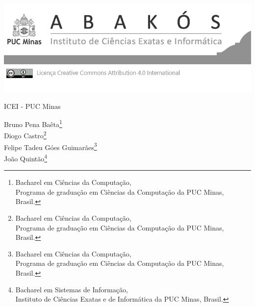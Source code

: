\documentclass[a4paper,12pt,Times]{article}
\makeatletter
\newcommand{\monogES}{ICEI - PUC Minas}
\newcommand{\origem}{Brasil}  %
\newcommand{\AutorA}{Felipe Tadeu Góes Guimarães}
\newcommand{\funcaoA}{Bacharel em Ciências da Computação}
\newcommand{\cursA}{Programa de graduação em Ciências da Computação da PUC Minas}
\newcommand{\AutorB}{Bruno Pena Baêta}
\newcommand{\funcaoB}{Bacharel em Ciências da Computação}
\newcommand{\cursB}{Programa de graduação em Ciências da Computação da PUC Minas}
\newcommand{\AutorC}{Diogo Castro}
\newcommand{\funcaoC}{Bacharel em Ciências da Computação}
\newcommand{\emailC}{@sga.pucminas.br}
\newcommand{\cursC}{Programa de graduação em Ciências da Computação da PUC Minas}
\newcommand{\AutorD}{João Quintão}
\newcommand{\funcaoD}{Bacharel em Sistemas de Informação}
\newcommand{\emailD}{@pucminas.br}
\newcommand{\cursD}{Instituto de Ciências Exatas e de Informática da PUC Minas}
\makeatother
\begin{document}

\begin{flushleft}

\begin{minipage} [c][5cm][b]{16.5cm} %
\includegraphics[scale=1.1]{figuras/pucmg.png} 
\end{minipage}

 \vspace{0cm} {
  \normalsize{\monogES}
 }
\end{flushleft}
\begin{flushright}
\singlespacing 
\normalsize{\AutorB \footnote{\funcaoB, \\ \cursB, \origem. }} \\
\normalsize{\AutorC \footnote{\funcaoC, \\ \cursC, \origem. }} \\
\normalsize{\AutorA \footnote{\funcaoA, \\ \cursA, \origem. }} \\
\normalsize{\AutorD \footnote{\funcaoD, \\ \cursD, \origem. }} \\
\end{flushright}
\thispagestyle{empty}
\end{document}
